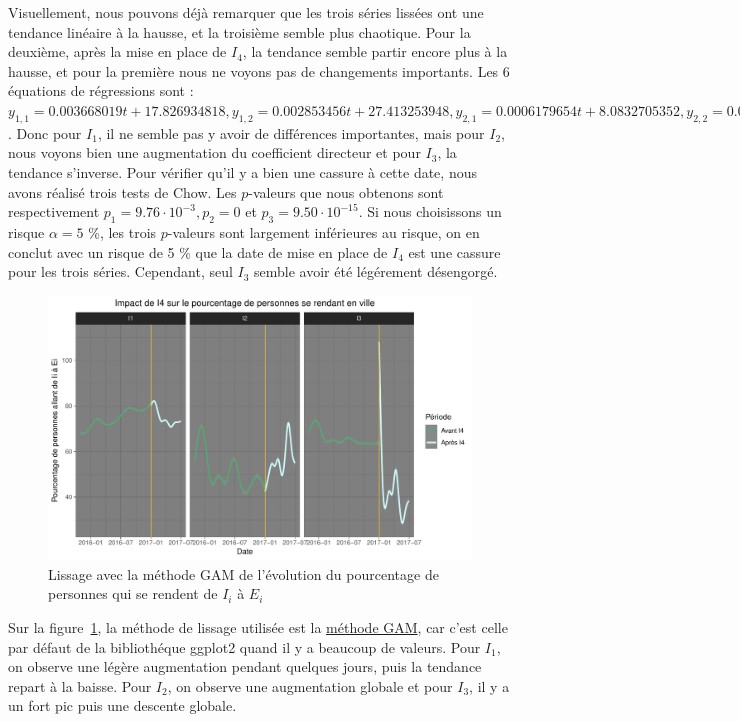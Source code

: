 \documentclass[titlepage]{article}
\begin{document}
Visuellement, nous pouvons déjà remarquer que les trois séries lissées ont une tendance linéaire à la hausse,
et la troisième semble plus chaotique. Pour la deuxième, après la mise en place de $I_4$, la tendance
semble partir encore plus à la hausse, et pour la première nous ne voyons pas de changements importants.
Les 6 équations de régressions sont : $y_{1, 1} = 0.003668019t + 17.826934818, y_{1, 2} = 0.002853456t + 27.413253948,
 y_{2, 1} =  0.0006179654t + 8.0832705352, y_{2, 2} = 0.00227276t - 8.53153529,
y_{3, 1} = 0.0008698147t + 7.5982644087, y_{3, 2} = -0.000122173t + 19.142058253$.
Donc pour $I_1$, il ne semble pas y avoir de différences importantes, mais pour $I_2$, nous voyons bien une augmentation du
coefficient directeur et pour $I_3$, la tendance s'inverse. Pour vérifier qu'il y a bien une cassure à cette date, nous avons
réalisé trois tests de Chow. Les $p$-valeurs que nous obtenons sont respectivement $p_1 = 9.76 \cdot 10^{-3},
p_2 = 0$ et $p_3 = 9.50 \cdot 10^{-15}$. Si nous choisissons un risque $\alpha = 5$ \%, les trois $p$-valeurs sont
largement inférieures au risque, on en conclut avec un risque de 5 \% que la date de mise en place de $I_4$ est une cassure pour
les trois séries. Cependant, seul $I_3$ semble avoir été légérement désengorgé.

\begin{figure}[H]
\centering
\includegraphics[scale=0.48]{pourcentage_intersection.pdf}
\caption{Lissage avec la méthode GAM de l'évolution du pourcentage de 
personnes qui se rendent de $I_i$ à $E_i$}
\label{figure:fig3}
\end{figure}

Sur la figure~\ref{figure:fig3}, la méthode de lissage utilisée est la \href{https://rdrr.io/cran/mgcv/man/gam.html}{méthode GAM}, car c'est
celle par défaut de la bibliothéque ggplot2 quand il y a beaucoup de valeurs. Pour $I_1$, on observe une légère augmentation pendant quelques
jours, puis la tendance repart à la baisse. Pour $I_2$, on observe une augmentation globale et pour $I_3$, il y a un fort pic puis une descente
globale.
\end{document}
